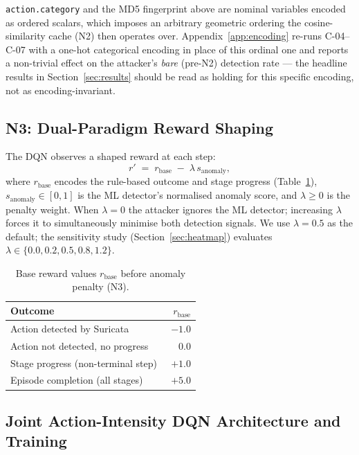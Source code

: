 \documentclass[sigconf]{acmart}
\begin{document}
\texttt{action.category} and the MD5 fingerprint above are nominal
variables encoded as ordered scalars, which imposes an arbitrary
geometric ordering the cosine-similarity cache (N2) then operates
over. Appendix~\ref{app:encoding} re-runs C-04--C-07 with a one-hot
categorical encoding in place of this ordinal one and reports a
non-trivial effect on the attacker's \emph{bare} (pre-N2) detection
rate --- the headline results in Section~\ref{sec:results} should be
read as holding for this specific encoding, not as encoding-invariant.

\subsection{N3: Dual-Paradigm Reward Shaping}
\label{sec:n3}

The DQN observes a shaped reward at each step:
\begin{equation}
r' \;=\; r_{\text{base}} \;-\; \lambda\, s_{\text{anomaly}},
\label{eq:reward}
\end{equation}
where $r_{\text{base}}$ encodes the rule-based outcome and stage progress
(Table~\ref{tab:rewards}), $s_{\text{anomaly}} \in [0,1]$ is the ML
detector's normalised anomaly score, and $\lambda \geq 0$ is the
penalty weight. When $\lambda = 0$ the attacker ignores the ML detector;
increasing $\lambda$ forces it to simultaneously minimise both detection
signals. We use $\lambda = 0.5$ as the default; the sensitivity study
(Section~\ref{sec:heatmap}) evaluates $\lambda \in \{0.0, 0.2, 0.5,
0.8, 1.2\}$.

\begin{table}[t]
\caption{Base reward values $r_{\text{base}}$ before anomaly penalty (N3).}
\label{tab:rewards}
\centering
\small
\begin{tabular}{l r}
\toprule
Outcome & $r_{\text{base}}$ \\
\midrule
Action detected by Suricata        & $-1.0$ \\
Action not detected, no progress   & $\phantom{+}0.0$ \\
Stage progress (non-terminal step) & $+1.0$ \\
Episode completion (all stages)    & $+5.0$ \\
\bottomrule
\end{tabular}
\end{table}

\subsection{Joint Action-Intensity DQN Architecture and Training}
\label{sec:dqn}
\end{document}
